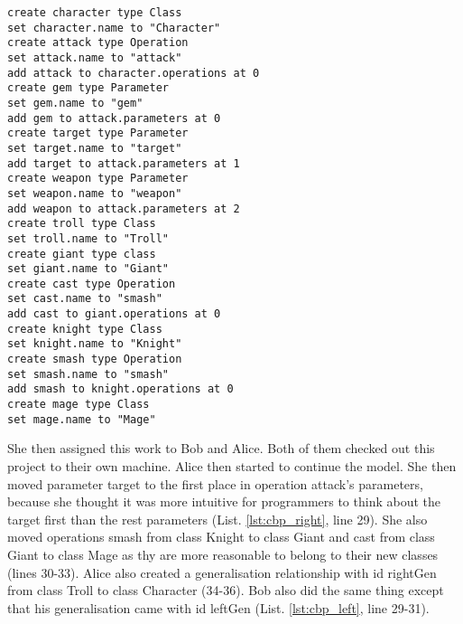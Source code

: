 \vspace{-15pt}
\begin{lstlisting}[firstnumber=1,style=eol,caption={The recorded events to produce the original model in Fig. \ref{fig:class_diagram_origin} (original version).},label=lst:cbp_origin]
create character type Class
set character.name to "Character" 
create attack type Operation
set attack.name to "attack" 
add attack to character.operations at 0
create gem type Parameter
set gem.name to "gem" 
add gem to attack.parameters at 0
create target type Parameter
set target.name to "target" 
add target to attack.parameters at 1
create weapon type Parameter
set weapon.name to "weapon" 
add weapon to attack.parameters at 2
create troll type Class
set troll.name to "Troll" 
create giant type class
set giant.name to "Giant"
create cast type Operation
set cast.name to "smash"
add cast to giant.operations at 0
create knight type Class
set knight.name to "Knight"
create smash type Operation
set smash.name to "smash"
add smash to knight.operations at 0
create mage type Class
set mage.name to "Mage" 
\end{lstlisting}

She then assigned this work to Bob and Alice. Both of them checked out this project to their own machine. Alice then started to continue the model. She then moved parameter \textsf{target} to the first place in operation \textsf{attack}'s parameters, because she thought it was more intuitive for programmers to think about the \textsf{target} first than the rest parameters (List. \ref{lst:cbp_right}, line 29). She also moved operations \textsf{smash} from class \textsf{Knight} to class \textsf{Giant} and \textsf{cast} from class \textsf{Giant} to class \textsf{Mage} as thy are more reasonable to belong to their new classes (lines 30-33). Alice also created a generalisation relationship with id \textsf{rightGen} from class \textsf{Troll} to class \textsf{Character} (34-36). Bob also did the same thing except that his generalisation came with id \textsf{leftGen} (List. \ref{lst:cbp_left}, line 29-31). 

